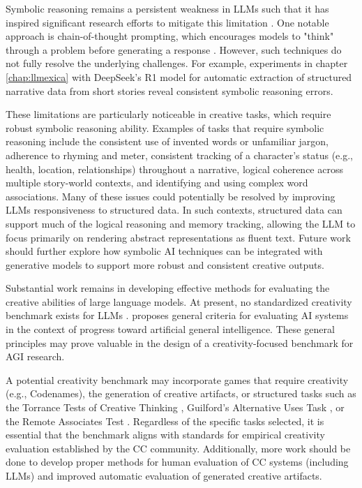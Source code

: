 \documentclass[phd,electronic,oneside,twosidetoc,letterpaper,chaptercenter,parttop,lof]{byumsphd}
\begin{document}
Symbolic reasoning remains a persistent weakness in LLMs such that it has inspired significant research efforts to mitigate this limitation \cite{Yu2023NaturalLR}. 
One notable approach is chain-of-thought prompting, which encourages models to "think" through a problem before generating a response \cite{wei2022cot}.  
However, such techniques do not fully resolve the underlying challenges. 
For example, experiments in chapter \ref{chap:llmexica} with DeepSeek's R1 model for automatic extraction of structured narrative data from short stories reveal consistent symbolic reasoning errors. 

These limitations are particularly noticeable in creative tasks, which require robust symbolic reasoning ability. 
Examples of tasks that require symbolic reasoning include the consistent use of invented words or unfamiliar jargon, adherence to rhyming and meter, consistent tracking of a character's status (e.g., health, location, relationships) throughout a narrative, logical coherence across multiple story-world contexts, and identifying and using complex word associations. 
Many of these issues could potentially be resolved by improving LLMs responsiveness to structured data. 
In such contexts, structured data can support much of the logical reasoning and memory tracking, allowing the LLM to focus primarily on rendering abstract representations as fluent text. 
Future work should further explore how symbolic AI techniques can be integrated with generative models to support more robust and consistent creative outputs.

Substantial work remains in developing effective methods for evaluating the creative abilities of large language models. 
At present, no standardized creativity benchmark exists for LLMs \cite{peeperkorn2024temperature}. 
\citeauthor{Morris2023PositionLO} proposes general criteria for evaluating AI systems in the context of progress toward artificial general intelligence. 
These general principles may prove valuable in the design of a creativity-focused benchmark for AGI research.

A potential creativity benchmark may incorporate games that require creativity (e.g., Codenames), the generation of creative artifacts, or structured tasks such as the Torrance Tests of Creative Thinking \cite{torrance1966tests}, Guilford's Alternative Uses Task \cite{guilford1967nature}, or the Remote Associates Test \cite{mednick1968rat}. 
Regardless of the specific tasks selected, it is essential that the benchmark aligns with standards for empirical creativity evaluation established by the CC community. 
Additionally, more work should be done to develop proper methods for human evaluation of CC systems (including LLMs) and improved automatic evaluation of generated creative artifacts.
\end{document}
